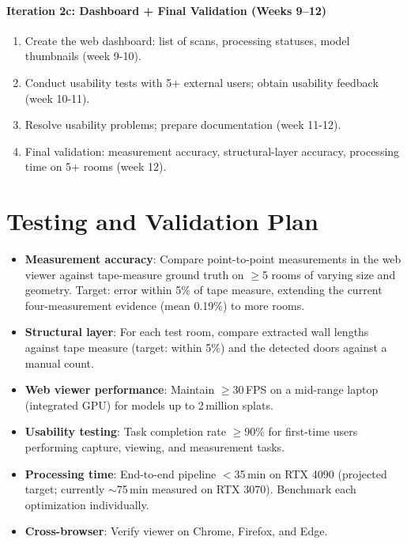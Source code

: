 \paragraph{Iteration 2c: Dashboard + Final Validation (Weeks 9--12)}
\begin{enumerate}
    \item Create the web dashboard: list of scans, processing statuses, model thumbnails (week 9-10).
    \item Conduct usability tests with 5+ external users; obtain usability feedback (week 10-11).
    \item Resolve usability problems; prepare documentation (week 11-12).
    \item Final validation: measurement accuracy, structural-layer accuracy, processing time on 5+ rooms (week 12).
\end{enumerate}

\section{Testing and Validation Plan}
\begin{itemize}
    \item \textbf{Measurement accuracy}: Compare point-to-point measurements in the web viewer against tape-measure ground truth on $\geq$5 rooms of varying size and geometry. Target: error within 5\% of tape measure, extending the current four-measurement evidence (mean 0.19\%) to more rooms.
    \item \textbf{Structural layer}: For each test room, compare extracted wall lengths against tape measure (target: within 5\%) and the detected doors against a manual count.
    \item \textbf{Web viewer performance}: Maintain $\geq$30\,FPS on a mid-range laptop (integrated GPU) for models up to 2\,million splats.
    \item \textbf{Usability testing}: Task completion rate $\geq$90\% for first-time users performing capture, viewing, and measurement tasks.
    \item \textbf{Processing time}: End-to-end pipeline $<$35\,min on RTX 4090 (projected target; currently $\sim$75\,min measured on RTX 3070). Benchmark each optimization individually.
    \item \textbf{Cross-browser}: Verify viewer on Chrome, Firefox, and Edge.
\end{itemize}

